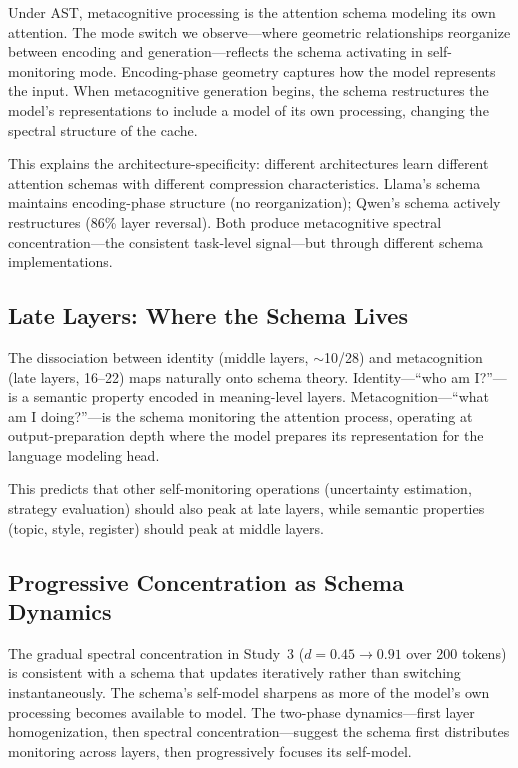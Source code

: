 \documentclass[11pt,a4paper]{article}
\begin{document}
Under AST, metacognitive processing is the attention schema modeling its
own attention. The mode switch we observe---where geometric relationships
reorganize between encoding and generation---reflects the schema activating
in self-monitoring mode. Encoding-phase geometry captures how the model
represents the input. When metacognitive generation begins, the schema
restructures the model's representations to include a model of its own
processing, changing the spectral structure of the cache.

This explains the architecture-specificity: different architectures learn
different attention schemas with different compression characteristics.
Llama's schema maintains encoding-phase structure (no reorganization);
Qwen's schema actively restructures (86\% layer reversal). Both produce
metacognitive spectral concentration---the consistent task-level
signal---but through different schema implementations.

\subsection{Late Layers: Where the Schema Lives}

The dissociation between identity (middle layers, $\sim$10/28) and
metacognition (late layers, 16--22) maps naturally onto schema theory.
Identity---``who am I?''---is a semantic property encoded in meaning-level
layers. Metacognition---``what am I doing?''---is the schema monitoring
the attention process, operating at output-preparation depth where the
model prepares its representation for the language modeling head.

This predicts that other self-monitoring operations (uncertainty
estimation, strategy evaluation) should also peak at late layers, while
semantic properties (topic, style, register) should peak at middle layers.

\subsection{Progressive Concentration as Schema Dynamics}

The gradual spectral concentration in Study~3 ($d = 0.45 \to 0.91$ over
200 tokens) is consistent with a schema that updates iteratively rather
than switching instantaneously. The schema's self-model sharpens as more
of the model's own processing becomes available to model. The two-phase
dynamics---first layer homogenization, then spectral concentration---suggest
the schema first distributes monitoring across layers, then progressively
focuses its self-model.
\end{document}
